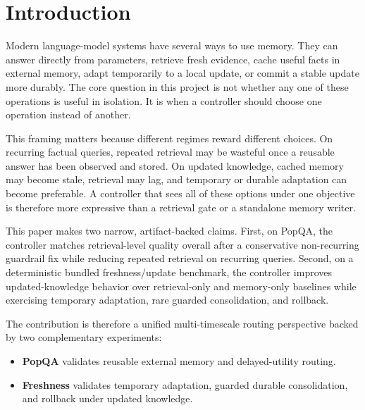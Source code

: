 \section{Introduction}

Modern language-model systems have several ways to use memory. They can answer directly from parameters, retrieve fresh evidence, cache useful facts in external memory, adapt temporarily to a local update, or commit a stable update more durably. The core question in this project is not whether any one of these operations is useful in isolation. It is when a controller should choose one operation instead of another.

This framing matters because different regimes reward different choices. On recurring factual queries, repeated retrieval may be wasteful once a reusable answer has been observed and stored. On updated knowledge, cached memory may become stale, retrieval may lag, and temporary or durable adaptation can become preferable. A controller that sees all of these options under one objective is therefore more expressive than a retrieval gate or a standalone memory writer.

This paper makes two narrow, artifact-backed claims. First, on PopQA, the controller matches retrieval-level quality overall after a conservative non-recurring guardrail fix while reducing repeated retrieval on recurring queries. Second, on a deterministic bundled freshness/update benchmark, the controller improves updated-knowledge behavior over retrieval-only and memory-only baselines while exercising temporary adaptation, rare guarded consolidation, and rollback.

The contribution is therefore a unified multi-timescale routing perspective backed by two complementary experiments:
\begin{itemize}[leftmargin=1.5em]
\item \textbf{PopQA} validates reusable external memory and delayed-utility routing.
\item \textbf{Freshness} validates temporary adaptation, guarded durable consolidation, and rollback under updated knowledge.
\end{itemize}
